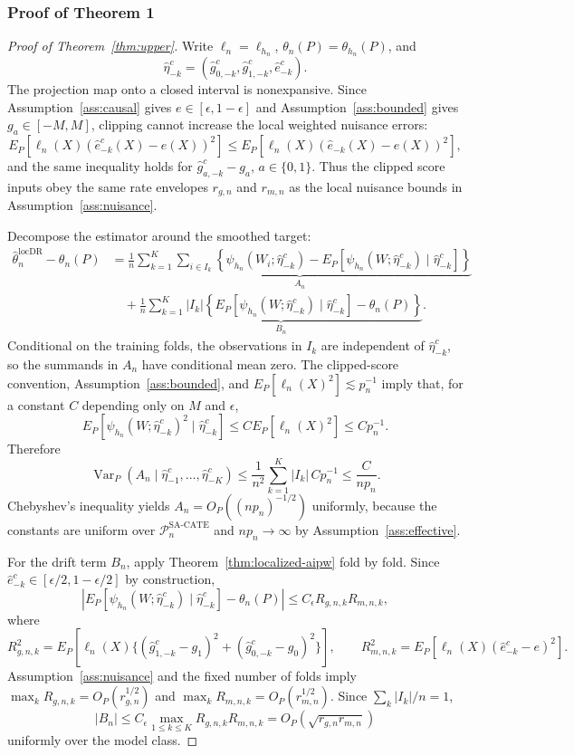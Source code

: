 \documentclass[11pt]{article}
\theoremstyle{definition}
\theoremstyle{plain}
\theoremstyle{remark}
\begin{document}
\subsubsection*{Proof of Theorem 1}
\begin{proof}[Proof of Theorem~\ref{thm:upper}]
Write $\ell_n=\ell_{h_n}$, $\theta_n(P)=\theta_{h_n}(P)$, and
\[
  \hat\eta^c_{-k}=(\hat g^c_{0,-k},\hat g^c_{1,-k},\hat e^c_{-k}).
\]
The projection map onto a closed interval is nonexpansive. Since Assumption~\ref{ass:causal} gives
$e\in[\epsilon,1-\epsilon]$ and Assumption~\ref{ass:bounded} gives $g_a\in[-M,M]$, clipping cannot
increase the local weighted nuisance errors:
\[
  E_P[\ell_n(X)(\hat e^c_{-k}(X)-e(X))^2]
  \le E_P[\ell_n(X)(\hat e_{-k}(X)-e(X))^2],
\]
and the same inequality holds for $\hat g^c_{a,-k}-g_a$, $a\in\{0,1\}$. Thus the clipped score inputs
obey the same rate envelopes $r_{g,n}$ and $r_{m,n}$ as the local nuisance bounds in
Assumption~\ref{ass:nuisance}.

Decompose the estimator around the smoothed target:
\[
\begin{aligned}
  \hat\theta_n^{\mathrm{locDR}}-\theta_n(P)
  &=
  \underbrace{
  \frac{1}{n}\sum_{k=1}^K\sum_{i\in I_k}
  \left\{\psi_{h_n}(W_i;\hat\eta^c_{-k})
       -E_P[\psi_{h_n}(W;\hat\eta^c_{-k})\mid \hat\eta^c_{-k}]\right\}}_{A_n} \\
  &\quad+
  \underbrace{
  \frac{1}{n}\sum_{k=1}^K |I_k|
  \left\{E_P[\psi_{h_n}(W;\hat\eta^c_{-k})\mid \hat\eta^c_{-k}]-\theta_n(P)\right\}}_{B_n}.
\end{aligned}
\]
Conditional on the training folds, the observations in $I_k$ are independent of
$\hat\eta^c_{-k}$, so the summands in $A_n$ have conditional mean zero. The clipped-score convention,
Assumption~\ref{ass:bounded}, and $E_P[\ell_n(X)^2]\lesssim p_n^{-1}$ imply that, for a constant $C$
depending only on $M$ and $\epsilon$,
\[
  E_P\!\left[\psi_{h_n}(W;\hat\eta^c_{-k})^2\mid \hat\eta^c_{-k}\right]
  \le C E_P[\ell_n(X)^2]
  \le C p_n^{-1}.
\]
Therefore
\[
  \operatorname{Var}_P(A_n\mid \hat\eta^c_{-1},\ldots,\hat\eta^c_{-K})
  \le
  \frac{1}{n^2}\sum_{k=1}^K |I_k|\,C p_n^{-1}
  \le \frac{C}{n p_n}.
\]
Chebyshev's inequality yields $A_n=O_P((n p_n)^{-1/2})$ uniformly, because the constants are uniform
over $\mathcal{P}_n^{\mathrm{SA\text{-}CATE}}$ and $n p_n\to\infty$ by
Assumption~\ref{ass:effective}.

For the drift term $B_n$, apply Theorem~\ref{thm:localized-aipw} fold by fold. Since
$\hat e^c_{-k}\in[\epsilon/2,1-\epsilon/2]$ by construction,
\[
  \left|
  E_P[\psi_{h_n}(W;\hat\eta^c_{-k})\mid \hat\eta^c_{-k}]
  -\theta_n(P)
  \right|
  \le
  C_\epsilon R_{g,n,k}R_{m,n,k},
\]
where
\[
  R_{g,n,k}^2
  =
  E_P[\ell_n(X)\{(\hat g^c_{1,-k}-g_1)^2+(\hat g^c_{0,-k}-g_0)^2\}],
  \qquad
  R_{m,n,k}^2
  =
  E_P[\ell_n(X)(\hat e^c_{-k}-e)^2].
\]
Assumption~\ref{ass:nuisance} and the fixed number of folds imply
$\max_k R_{g,n,k}=O_P(r_{g,n}^{1/2})$ and
$\max_k R_{m,n,k}=O_P(r_{m,n}^{1/2})$. Since $\sum_k |I_k|/n=1$,
\[
  |B_n|
  \le C_\epsilon \max_{1\le k\le K} R_{g,n,k}R_{m,n,k}
  =
  O_P\!\left(\sqrt{r_{g,n}r_{m,n}}\right)
\]
uniformly over the model class.


\end{proof}
\end{document}
